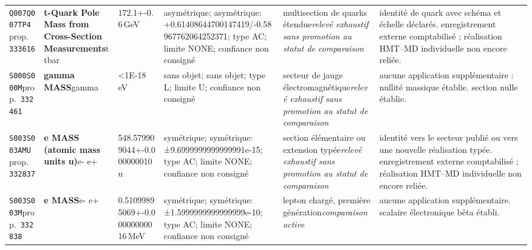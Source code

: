 \begin{landscape}
\begin{longtable}{L{1.85cm}L{4.45cm}L{2.35cm}L{4.05cm}L{3.35cm}L{7.15cm}}
\texttt{Q007}\newline \texttt{Q007TP4}\newline prop.\ \texttt{333616} & \textbf{t-Quark Pole Mass from Cross-Section Measurements}\newline t \textbar{}\allowbreak{} tbar & 172.1+-0.6\,GeV & asymétrique; asymétrique: +0.61408644700147419/-0.58967762064252371; type AC; limite NONE; confiance non consigné & multisection de quarks étendue\newline \emph{relevé exhaustif sans promotion au statut de comparaison} & identité de quark avec schéma et échelle déclarés. enregistrement externe comptabilisé ; réalisation HMT--MD individuelle non encore reliée. \\
\texttt{S000}\newline \texttt{S000M}\newline prop.\ \texttt{332461} & \textbf{gamma MASS}\newline gamma & \textless{}1E-18\,eV & sans objet; sans objet; type L; limite U; confiance non consigné & secteur de jauge électromagnétique\newline \emph{relevé exhaustif sans promotion au statut de comparaison} & aucune application supplémentaire : nullité massique établie. section nulle établie. \\
\texttt{S003}\newline \texttt{S003AMU}\newline prop.\ \texttt{332837} & \textbf{e MASS (atomic mass units u)}\newline e- \textbar{}\allowbreak{} e+ & 548.579909044+-0.000000010\,u & symétrique; symétrique: ±9.6999999999999991e-15; type AC; limite NONE; confiance non consigné & section élémentaire ou extension typée\newline \emph{relevé exhaustif sans promotion au statut de comparaison} & identité vers le secteur publié ou vers une nouvelle réalisation typée. enregistrement externe comptabilisé ; réalisation HMT--MD individuelle non encore reliée. \\
\texttt{S003}\newline \texttt{S003M}\newline prop.\ \texttt{332838} & \textbf{e MASS}\newline e- \textbar{}\allowbreak{} e+ & 0.51099895069+-0.00000000016\,MeV & symétrique; symétrique: ±1.5999999999999999e-10; type AC; limite NONE; confiance non consigné & lepton chargé, première génération\newline \emph{comparaison active} & aucune application supplémentaire. scalaire électronique bêta établi. \\

\end{longtable}
\end{landscape}
